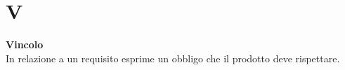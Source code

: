 \section{V}
\textbf{Vincolo}\\
In relazione a un requisito esprime un obbligo che il prodotto deve rispettare. \\ \\
\clearpage